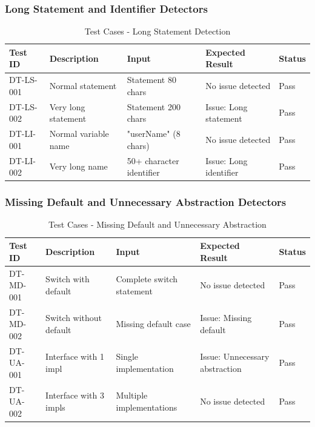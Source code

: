 \documentclass[12pt,a4paper]{article}
\begin{document}
    \subsubsection{Long Statement and Identifier Detectors}

    \begin{table}[H]
        \caption{Test Cases - Long Statement Detection}
        \begin{tabular}{|p{2cm}|p{4cm}|p{3cm}|p{3cm}|p{1.5cm}|}
            \hline
            \textbf{Test ID} & \textbf{Description} & \textbf{Input} & \textbf{Expected Result} & \textbf{Status} \\
            \hline
            DT-LS-001 & Normal statement & Statement 80 chars & No issue detected & Pass \\
            \hline
            DT-LS-002 & Very long statement & Statement 200 chars & Issue: Long statement & Pass \\
            \hline
            DT-LI-001 & Normal variable name & "userName" (8 chars) & No issue detected & Pass \\
            \hline
            DT-LI-002 & Very long name & 50+ character identifier & Issue: Long identifier & Pass \\
            \hline
        \end{tabular}
    \end{table}

    \subsubsection{Missing Default and Unnecessary Abstraction Detectors}

    \begin{table}[H]
        \caption{Test Cases - Missing Default and Unnecessary Abstraction}
        \begin{tabular}{|p{2cm}|p{4cm}|p{3cm}|p{3cm}|p{1.5cm}|}
            \hline
            \textbf{Test ID} & \textbf{Description} & \textbf{Input} & \textbf{Expected Result} & \textbf{Status} \\
            \hline
            DT-MD-001 & Switch with default & Complete switch statement & No issue detected & Pass \\
            \hline
            DT-MD-002 & Switch without default & Missing default case & Issue: Missing default & Pass \\
            \hline
            DT-UA-001 & Interface with 1 impl & Single implementation & Issue: Unnecessary abstraction & Pass \\
            \hline
            DT-UA-002 & Interface with 3 impls & Multiple implementations & No issue detected & Pass \\
            \hline
        \end{tabular}
    \end{table}
\end{document}

